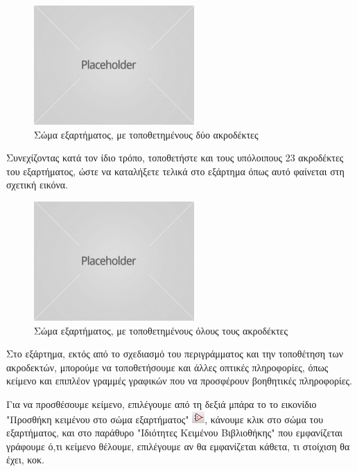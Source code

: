 \documentclass[a4paper]{article}
\begin{document}
\begin{figure}
  \begin{center}
    \includegraphics{img/kicad-main.png}
    \caption{Σώμα εξαρτήματος, με τοποθετημένους δύο ακροδέκτες}
    \label{fig:kicad-main}
  \end{center}
\end{figure}

Συνεχίζοντας κατά τον ίδιο τρόπο, τοποθετήστε και τους υπόλοιπους 23 ακροδέκτες του εξαρτήματος, ώστε να καταλήξετε τελικά στο εξάρτημα όπως αυτό φαίνεται στη σχετική εικόνα.

\begin{figure}
  \begin{center}
    \includegraphics{img/kicad-main.png}
    \caption{Σώμα εξαρτήματος, με τοποθετημένους όλους τους ακροδέκτες}
    \label{fig:kicad-main}
  \end{center}
\end{figure}

Στο εξάρτημα, εκτός από το σχεδιασμό του περιγράμματος και την τοποθέτηση των ακροδεκτών, μπορούμε να τοποθετήσουμε και άλλες οπτικές πληροφορίες, όπως κείμενο και επιπλέον γραμμές γραφικών που να προσφέρουν βοηθητικές πληροφορίες.

Για να προσθέσουμε κείμενο, επιλέγουμε από τη δεξιά μπάρα το το εικονίδιο "Προσθήκη κειμένου στο σώμα εξαρτήματος" \includegraphics{img/graphic.png}, κάνουμε κλικ στο σώμα του εξαρτήματος, και στο παράθυρο "Ιδιότητες Κειμένου Βιβλιοθήκης" που εμφανίζεται γράφουμε ό,τι κείμενο θέλουμε, επιλέγουμε αν θα εμφανίζεται κάθετα, τι στοίχιση θα έχει, κοκ.
\end{document}
